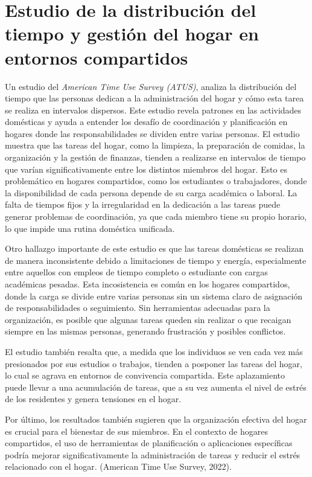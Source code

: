 \newpage

\section{Estudio de la distribución del tiempo y gestión del hogar en entornos compartidos}

Un estudio del \textit{American Time Use Survey (ATUS)}, analiza la distribución del tiempo que las personas dedican a la administración del hogar
y cómo esta tarea se realiza en intervalos dispersos. Este estudio revela patrones en las actividades domésticas y ayuda a entender los 
desafío de coordinación y planificación en hogares donde las responsabilidades se dividen entre varias personas. El estudio muestra
que las tareas del hogar, como la limpieza, la preparación de comidas, la organización y la gestión de finanzas, tienden a realizarse en 
intervalos de tiempo que varían significativamente entre los distintos miembros del hogar. Esto es problemático en hogares compartidos, como 
los estudiantes o trabajadores, donde la disponibilidad de cada persona depende de su carga académica o laboral. La falta de tiempos fijos y 
la irregularidad en la dedicación a las tareas puede generar problemas de coordinación, ya que cada miembro tiene su propio horario, lo que impide
una rutina doméstica unificada.

Otro hallazgo importante de este estudio es que las tareas domésticas se realizan de manera inconsistente debido a limitaciones de tiempo y energía, especialmente
entre aquellos con empleos de tiempo completo o estudiante con cargas académicas pesadas. Esta incosistencia es común en los hogares compartidos,
donde la carga se divide entre varias personas sin un sistema claro de asignación de responsabilidades o seguimiento. Sin herramientas adecuadas
para la organización, es posible que algunas tareas queden sin realizar o que recaigan siempre en las mismas personas, generando frustración y posibles 
conflictos.

El estudio también resalta que, a medida que los individuos se ven cada vez más presionados por sus estudios o trabajos, tienden a posponer las tareas del hogar, lo cual se 
agrava en entornos de convivencia compartida. Este aplazamiento puede llevar a una acumulación de tareas, que a su vez aumenta el nivel de estrés de los residentes y genera tensiones en el hogar.

Por último, los resultados también sugieren que la organización efectiva del hogar es crucial para el bienestar de sus miembros. En el contexto de hogares compartidos,
el uso de herramientas de planificación o aplicaciones específicas podría mejorar significativamente la administración de tareas y reducir el 
estrés relacionado con el hogar. (American Time Use Survey, 2022).





